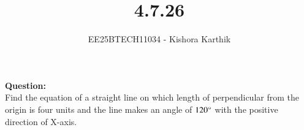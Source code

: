 \documentclass[journal]{IEEEtran}
\begin{document}

\vspace{1cm}

\title{4.7.26}
\author{EE25BTECH11034 - Kishora Karthik}
{\let\newpage\relax\maketitle}

\renewcommand{\thefigure}{\theenumi}
\renewcommand{\thetable}{\theenumi}
\textbf{Question:}\\
Find the equation of a straight line on which length of perpendicular from the origin is four units and the line makes an angle of $120\degree$ with the positive direction of X-axis.
\\
\end{document}
